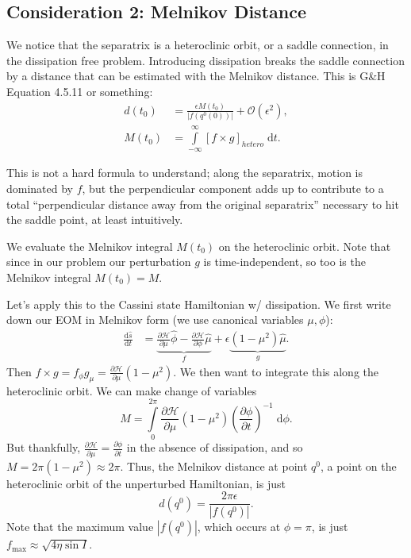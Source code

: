 \documentclass[11pt,
        usenames, %
        dvipsnames %
    ]{article}
\newcommand*{\rd}[2]{\frac{\mathrm{d}#1}{\mathrm{d}#2}}
\newcommand*{\pd}[2]{\frac{\partial#1}{\partial#2}}
\newcommand*{\abs}[1]{\left|#1\right|}
\newcommand*{\p}[1]{\left(#1\right)}
\newcommand*{\s}[1]{\left[#1\right]}
\begin{document}
\subsection{Consideration 2: Melnikov Distance}

We notice that the separatrix is a heteroclinic orbit, or a saddle connection,
in the dissipation free problem. Introducing dissipation breaks the saddle
connection by a distance that can be estimated with the Melnikov distance. This
is G\&H Equation 4.5.11 or something:
\begin{align}
    d(t_0) &= \frac{\epsilon M(t_0)}{\abs{f(q^0(0))}} + \mathcal{O}(\epsilon^2)
        ,\\
    M(t_0) &= \int\limits_{-\infty}^\infty
        \s{f \times g}_{hetero}\;\mathrm{d}t.
\end{align}

This is not a hard formula to understand; along the separatrix, motion is
dominated by $f$, but the perpendicular component adds up to contribute to a
total ``perpendicular distance away from the original separatrix'' necessary to
hit the saddle point, at least intuitively.

We evaluate the Melnikov integral $M(t_0)$ on the heteroclinic orbit. Note that
since in our problem our perturbation $g$ is time-independent, so too is the
Melnikov integral $M(t_0) = M$.

Let's apply this to the Cassini state Hamiltonian w/ dissipation. We first write
down our EOM in Melnikov form (we use canonical variables $\mu, \phi$):
\begin{align}
    \rd{\hat{s}}{t}
        &= \underbrace{
            \pd{\mathcal{H}}{\mu}\hat{\phi} - \pd{\mathcal{H}}{\phi}\hat{\mu}}_f
            + \epsilon \underbrace{\p{1 - \mu^2}\hat{\mu}}_g.
\end{align}
Then $f \times g = f_\phi g_\mu = \pd{\mathcal{H}}{\mu}\p{1 - \mu^2}$. We then
want to integrate this along the heteroclinic orbit. We can make change of
variables
\begin{equation}
    M = \int\limits_0^{2\pi}\pd{\mathcal{H}}{\mu}
        \p{1 - \mu^2}\p{\pd{\phi}{t}}^{-1}\;\mathrm{d}\phi.
\end{equation}
But thankfully, $\pd{\mathcal{H}}{\mu} = \pd{\phi}{t}$ in the absence of
dissipation, and so $M = 2\pi\p{1 - \mu^2} \approx 2\pi$.
Thus, the Melnikov distance at point $q^0$, a point on the heteroclinic
orbit of the unperturbed Hamiltonian, is just
\begin{equation}
    d(q^0) = \frac{2\pi \epsilon}{\abs{f(q^0)}}.
\end{equation}
Note that the maximum value $\abs{f(q^0)}$, which occurs at $\phi = \pi$, is
just $f_{\max} \approx \sqrt{4\eta \sin I}$.
\end{document}
